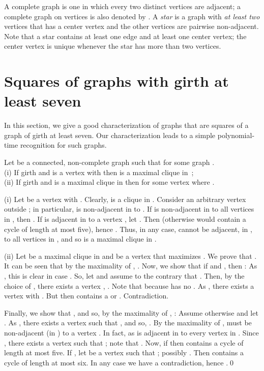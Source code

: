 \documentclass[proceedings]{stacs}
\newlength{\ai}
\begin{document}
A complete graph is one in which every two distinct vertices are adjacent; a complete graph on 
  vertices is also denoted by .
A \emph{star} is a graph with \emph{at least two} vertices that has a center vertex and
  the other vertices are pairwise non-adjacent.
Note that a star contains at least one edge and at least one center vertex;
  the center vertex is unique whenever the star has more than two vertices.


\section{Squares of graphs with girth at least seven}\label{sec:girthseven}
In this section, we give a good characterization of graphs that are squares
of a graph of girth at least seven.
Our characterization leads to a simple polynomial-time
recognition for such graphs.
\begin{prop}\label{prop:maxclique}
Let  be a connected, non-complete graph such that  for some graph . \\
(i)  If girth and  is a vertex with  then  is a maximal clique in~;\\
(ii) If girth and  is a maximal clique in  then  for some vertex  where .
\end{prop}

\proof
(i) Let  be a vertex with . Clearly,  is a clique in .
Consider an arbitrary vertex  outside ; in particular,  is non-adjacent in  to .
If  is non-adjacent in  to all vertices in , then . If  is adjacent
in  to a vertex , let . Then 
(otherwise  would contain a cycle of length at most five), hence . Thus, in
any case,  cannot be adjacent, in , to all vertices in , and so  is a maximal
clique in .

(ii) Let  be a maximal clique in  and  be a vertex that maximizes .
We prove that .
It can be seen that by the maximality of , .
Now, we show that if  and , then :
As , this is clear in case . So, let  and
assume to the contrary that . Then, by the choice of , there exists a vertex
, . Note that  because  has no
. As , there exists a vertex  with
. But then  contains a  or . Contradiction.

Finally, we show that , and so, by the maximality of , :
Assume otherwise and let .
As , there exists a vertex  such that , and so,
. By the maximality of ,  must be non-adjacent (in ) to a vertex
. In fact,  as  is adjacent in  to every vertex in .
Since , there exists a vertex  such that
; note that . Now, if  then 
contains a cycle of length at most five. If , let  be a vertex such that
; possibly . Then  contains a cycle of length at most
six. In any case we have a contradiction, hence .\qed
\end{document}
